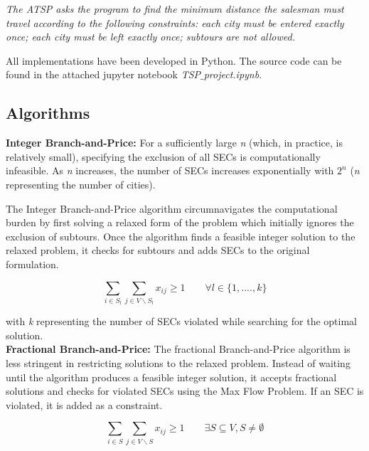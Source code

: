 \documentclass[12pt]{article}
\numberwithin{equation}{section}
\begin{document}
\vspace{1em}

\textit{\small The ATSP asks the program to find the minimum distance the salesman must travel according to the following constraints: each city must be entered exactly once; each city must be left exactly once; subtours are not allowed.}

All implementations have been developed in Python. The source code can be found in the attached jupyter notebook \textit{TSP$\_$project.ipynb}.

\vspace{1em} 

\subsection{Algorithms}

\textbf{Integer Branch-and-Price:} For a sufficiently large \textit{n} (which, in practice, is relatively small), specifying the exclusion of all SECs is computationally infeasible. As \textit{n} increases, the number of SECs increases exponentially with $2^n$ (\textit{n} representing the number of cities).

The Integer Branch-and-Price algorithm circumnavigates the computational burden by first solving a relaxed form of the problem which initially ignores the exclusion of subtours. Once the algorithm finds a feasible integer solution to the relaxed problem, it checks for subtours and adds SECs to the original formulation. 

\begin{equation}
\sum_{i \in S_l} \sum_{j \in V \backslash S_l} x_{ij} \geq 1 \quad \quad \forall l \in \{1, ...., k \}
\end{equation}

with \textit{k} representing the number of SECs violated while searching for the optimal solution.\\

\noindent\textbf{Fractional Branch-and-Price:} The fractional Branch-and-Price algorithm is less stringent in restricting solutions to the relaxed problem. Instead of waiting until the algorithm produces a feasible integer solution, it accepts fractional solutions and checks for violated SECs using the Max Flow Problem. If an SEC is violated, it is added as a constraint.

\begin{equation}
\sum_{i \in S} \sum_{j \in V \backslash S} x_{ij} \ge 1 \quad \quad \exists S  \subseteq V , S  \ne \emptyset 
\end{equation}
\end{document}
